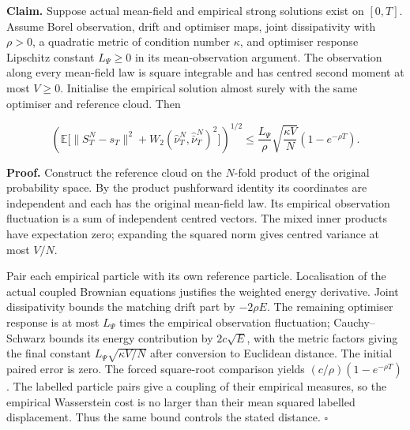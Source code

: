 \documentclass[11pt,a4paper]{report}
\begin{document}
\textbf{Claim.} Suppose actual mean-field and empirical strong solutions exist on \([0,T]\). Assume Borel observation, drift and optimiser maps, joint dissipativity with \(\rho>0\), a quadratic metric of condition number \(\kappa\), and optimiser response Lipschitz constant \(L_\Psi\ge0\) in its mean-observation argument. The observation along every mean-field law is square integrable and has centred second moment at most \(V\ge0\). Initialise the empirical solution almost surely with the same optimiser and reference cloud. Then

\[\left(\mathbb E\big[\|S^N_T-s_T\|^2+W_2(\widehat\nu^N_T,\widehat{\bar\nu}^N_T)^2\big]\right)^{1/2}\le\frac{L_\Psi}{\rho}\sqrt{\frac{\kappa V}{N}}(1-e^{-\rho T}).\]

\textbf{Proof.} Construct the reference cloud on the \(N\)-fold product of the original probability space. By the product pushforward identity its coordinates are independent and each has the original mean-field law. Its empirical observation fluctuation is a sum of independent centred vectors. The mixed inner products have expectation zero; expanding the squared norm gives centred variance at most \(V/N\).



Pair each empirical particle with its own reference particle. Localisation of the actual coupled Brownian equations justifies the weighted energy derivative. Joint dissipativity bounds the matching drift part by \(-2\rho E\). The remaining optimiser response is at most \(L_\Psi\) times the empirical observation fluctuation; Cauchy–Schwarz bounds its energy contribution by \(2c\sqrt E\), with the metric factors giving the final constant \(L_\Psi\sqrt{\kappa V/N}\) after conversion to Euclidean distance. The initial paired error is zero. The forced square-root comparison yields \((c/\rho)(1-e^{-\rho T})\). The labelled particle pairs give a coupling of their empirical measures, so the empirical Wasserstein cost is no larger than their mean squared labelled displacement. Thus the same bound controls the stated distance. \(\square\)
\end{document}
